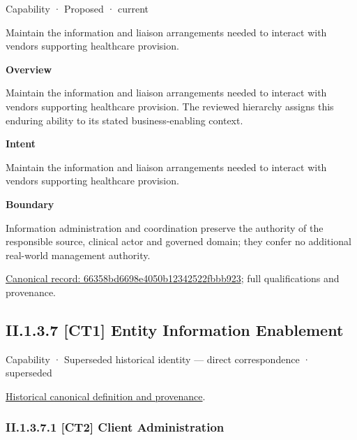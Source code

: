 \label{element:66358bd6698e4050b12342522fbbb923}
{\small Capability · Proposed · current}\par

Maintain the information and liaison arrangements needed to interact with vendors supporting healthcare provision.



\textbf{Overview}



Maintain the information and liaison arrangements needed to interact with vendors supporting healthcare provision. The reviewed hierarchy assigns this enduring ability to its stated business-enabling context.



\textbf{Intent}



Maintain the information and liaison arrangements needed to interact with vendors supporting healthcare provision.



\textbf{Boundary}



Information administration and coordination preserve the authority of the responsible source, clinical actor and governed domain; they confer no additional real-world management authority.


{\footnotesize \href{../../../../continuum/strategy/capability/66358bd6698e4050b12342522fbbb923.md}{Canonical record: 66358bd6698e4050b12342522fbbb923}; full qualifications and provenance.}\par
\subsection*{II.1.3.7 [CT1] Entity Information Enablement}
\label{navigation:II.1.3.7}

\label{element:e4d959d6c71d498c9ce00d2be4c048e3}
{\small Capability · Superseded historical identity — direct correspondence · superseded}\par
\href{../../../../continuum/strategy/capability/e4d959d6c71d498c9ce00d2be4c048e3.md}{Historical canonical definition and provenance}.\par
\subsubsection*{II.1.3.7.1 [CT2] Client Administration}
\label{navigation:II.1.3.7.1}

